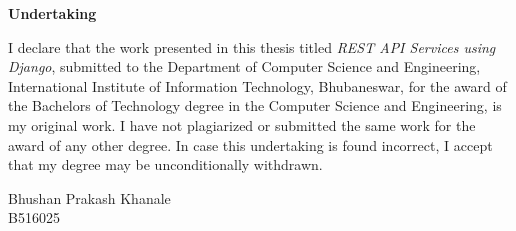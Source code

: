 \centerline{\Large{\bf Undertaking}}
\vspace{1cm}

I declare that the work presented in this thesis titled
\textit{REST API Services using Django}, submitted to the Department of
Computer Science and Engineering, International Institute of Information
Technology, Bhubaneswar, for the award of the Bachelors of Technology degree
in the Computer Science and Engineering, is my original work. I have not
plagiarized or submitted the same work for the award of any other degree.
In case this undertaking is found incorrect, I accept that my degree may be
unconditionally withdrawn.

\vspace*{0.5in}
\begin{flushright}
Bhushan Prakash Khanale\\
B516025
\end{flushright}
